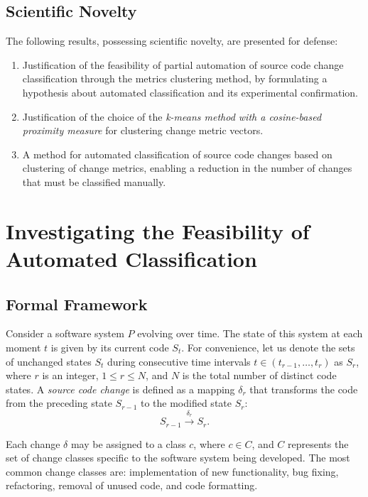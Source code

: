 \documentclass[11pt,a4paper]{article}
\begin{document}
\subsection{Scientific Novelty}

The following results, possessing scientific novelty, are presented for defense:

\begin{enumerate}
    \item Justification of the feasibility of partial automation of source code change classification through the metrics clustering method, by formulating a hypothesis about automated classification and its experimental confirmation.
    \item Justification of the choice of the \textit{k-means method with a cosine-based proximity measure} for clustering change metric vectors.
    \item A method for automated classification of source code changes based on clustering of change metrics, enabling a reduction in the number of changes that must be classified manually.
\end{enumerate}

\section{Investigating the Feasibility of Automated Classification}
\label{sec:feasibility}

\subsection{Formal Framework}

Consider a software system $P$ evolving over time. The state of this system at each moment $t$ is given by its current code $S_t$. For convenience, let us denote the sets of unchanged states $S_t$ during consecutive time intervals $t \in (t_{r-1}, \ldots, t_r)$ as $S_r$, where $r$ is an integer, $1 \le r \le N$, and $N$ is the total number of distinct code states. A \textit{source code change} is defined as a mapping $\delta_r$ that transforms the code from the preceding state $S_{r-1}$ to the modified state $S_r$:
\begin{equation}
    S_{r-1} \xrightarrow{\delta_r} S_r.
\end{equation}

Each change $\delta$ may be assigned to a class $c$, where $c \in C$, and $C$ represents the set of change classes specific to the software system being developed. The most common change classes are: implementation of new functionality, bug fixing, refactoring, removal of unused code, and code formatting.
\end{document}

